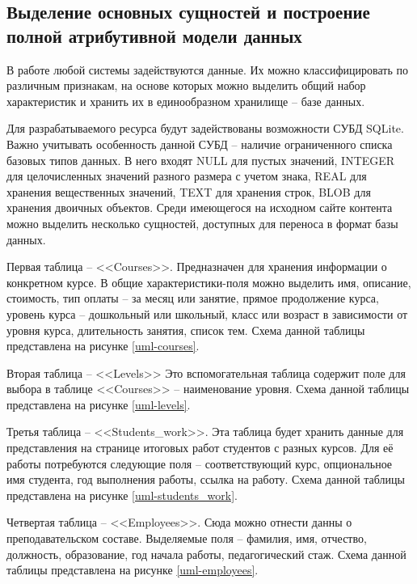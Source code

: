 \subsection{Выделение основных сущностей и построение полной атрибутивной модели данных}\label{Выделение основных сущностей и построение полной атрибутивной модели данных}

В работе любой системы задействуются данные.
Их можно классифицировать по различным признакам, на основе которых можно выделить общий набор характеристик и хранить их в единообразном хранилище -- базе данных.

Для разрабатываемого ресурса будут задействованы возможности СУБД SQLite.
Важно учитывать особенность данной СУБД -- наличие ограниченного списка базовых типов данных.
В него входят NULL для пустых значений, INTEGER для целочисленных значений разного размера с учетом знака, REAL для хранения вещественных значений, TEXT для хранения строк, BLOB для хранения двоичных объектов.
Среди имеющегося на исходном сайте контента можно выделить несколько сущностей, доступных для переноса в формат базы данных.

Первая таблица -- <<Courses>>.
Предназначен для хранения информации о конкретном курсе.
В общие характеристики-поля можно выделить имя, описание, стоимость, тип оплаты -- за месяц или занятие, прямое продолжение курса, уровень курса -- дошкольный или школьный, класс или возраст в зависимости от уровня курса, длительность занятия, список тем.
Схема данной таблицы представлена на рисунке \ref{uml-courses}.

Вторая таблица -- <<Levels>>
Это вспомогательная таблица содержит поле для выбора в таблице <<Courses>> -- наименование уровня.
Схема данной таблицы представлена на рисунке \ref{uml-levels}.

Третья таблица -- <<Students\_work>>.
Эта таблица будет хранить данные для представления на странице итоговых работ студентов с разных курсов.
Для её работы потребуются следующие поля -- соответствующий курс, опциональное имя студента, год выполнения работы, ссылка на работу.
Схема данной таблицы представлена на рисунке \ref{uml-students_work}.

Четвертая таблица -- <<Employees>>.
Сюда можно отнести данны о преподавательском составе.
Выделяемые поля -- фамилия, имя, отчество, должность, образование, год начала работы, педагогический стаж.
Схема данной таблицы представлена на рисунке \ref{uml-employees}.

